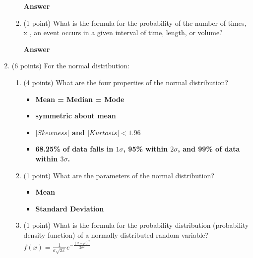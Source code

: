 \documentclass{article}
\begin{document}
\begin{enumerate}
\begin{enumerate}
	\textbf{Answer} \\
	\item (1 point) What is the formula for the probability of the number of times,
x , an event occurs in a given interval of time, length, or volume?

	\textbf{Answer} \\
	\end{enumerate}
	
\item (6 points) For the normal distribution:

	\begin{enumerate}
	
	\item (4 points) What are the four properties of the normal distribution?
	
		\begin{itemize}
		
		\item \textbf{Mean = Median = Mode}
		\item \textbf{symmetric about mean}
		\item \textbf{$|Skewness|$ and $|Kurtosis| < 1.96$}
		\item \textbf{68.25\% of data falls in $1 \sigma$, 95\% within $2 \sigma$, and 99\% of data within $3 \sigma$.\\}

		\end{itemize}
	

	\item(1 point) What are the parameters of the normal distribution?
	
		\begin{itemize}
		\item \textbf{Mean}
		\item \textbf{Standard Deviation}\\
		\end{itemize} 
	
	\item (1 point) What is the formula for the probability distribution (probability density function) of a normally distributed random variable? \\
	
	$f\left(x\right) = \frac{1}{\sigma \sqrt{2\pi}} e^{-\frac{\left(x - \mu\right)^{2}}{2 \sigma^{2}}}$\\


	
	\end{enumerate}
	

\end{enumerate}
\end{document}
